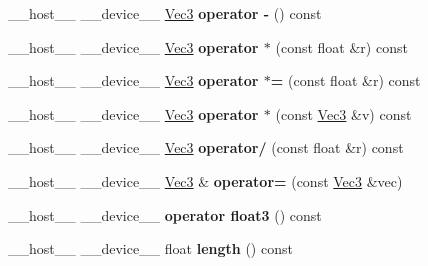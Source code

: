 \begin{DoxyCompactItemize}
\item 
\+\_\+\+\_\+host\+\_\+\+\_\+ \+\_\+\+\_\+device\+\_\+\+\_\+ \hyperlink{class_vec3}{Vec3} {\bfseries operator -\/} () const\hypertarget{class_vec3_ab8ef4a52f843e1381c3f22c6cd61fcc9}{}\label{class_vec3_ab8ef4a52f843e1381c3f22c6cd61fcc9}

\item 
\+\_\+\+\_\+host\+\_\+\+\_\+ \+\_\+\+\_\+device\+\_\+\+\_\+ \hyperlink{class_vec3}{Vec3} {\bfseries operator $\ast$} (const float \&r) const\hypertarget{class_vec3_a0fd3d63acd5e4ebbe2f8dda2825869fc}{}\label{class_vec3_a0fd3d63acd5e4ebbe2f8dda2825869fc}

\item 
\+\_\+\+\_\+host\+\_\+\+\_\+ \+\_\+\+\_\+device\+\_\+\+\_\+ \hyperlink{class_vec3}{Vec3} {\bfseries operator $\ast$=} (const float \&r) const\hypertarget{class_vec3_aaa0e591b69a2cf5d585e9d048d0c20f4}{}\label{class_vec3_aaa0e591b69a2cf5d585e9d048d0c20f4}

\item 
\+\_\+\+\_\+host\+\_\+\+\_\+ \+\_\+\+\_\+device\+\_\+\+\_\+ \hyperlink{class_vec3}{Vec3} {\bfseries operator $\ast$} (const \hyperlink{class_vec3}{Vec3} \&v) const\hypertarget{class_vec3_a2f1d4dcb982ffdc48e9c87d4d8a7655f}{}\label{class_vec3_a2f1d4dcb982ffdc48e9c87d4d8a7655f}

\item 
\+\_\+\+\_\+host\+\_\+\+\_\+ \+\_\+\+\_\+device\+\_\+\+\_\+ \hyperlink{class_vec3}{Vec3} {\bfseries operator/} (const float \&r) const\hypertarget{class_vec3_a9b66d38d3386efcfca935e2a90a95aa6}{}\label{class_vec3_a9b66d38d3386efcfca935e2a90a95aa6}

\item 
\+\_\+\+\_\+host\+\_\+\+\_\+ \+\_\+\+\_\+device\+\_\+\+\_\+ \hyperlink{class_vec3}{Vec3} \& {\bfseries operator=} (const \hyperlink{class_vec3}{Vec3} \&vec)\hypertarget{class_vec3_abd0c90cf6cc28577248e9ae86d72d5a9}{}\label{class_vec3_abd0c90cf6cc28577248e9ae86d72d5a9}

\item 
\+\_\+\+\_\+host\+\_\+\+\_\+ \+\_\+\+\_\+device\+\_\+\+\_\+ {\bfseries operator float3} () const\hypertarget{class_vec3_afa3f84872dfa8c04bed556854730e6a9}{}\label{class_vec3_afa3f84872dfa8c04bed556854730e6a9}

\item 
\+\_\+\+\_\+host\+\_\+\+\_\+ \+\_\+\+\_\+device\+\_\+\+\_\+ float {\bfseries length} () const\hypertarget{class_vec3_a12cbc93353a9dc6c9ea5e4b2977fc865}{}\label{class_vec3_a12cbc93353a9dc6c9ea5e4b2977fc865}


\end{DoxyCompactItemize}
